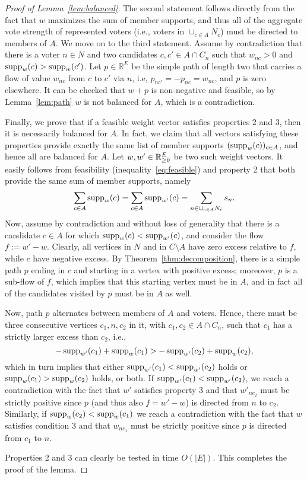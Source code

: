 \begin{proof}[Proof of Lemma~\ref{lem:balanced}]
The second statement follows directly from the fact that $w$ maximizes the sum of member supports, and thus all of the aggregate vote strength of represented voters (i.e., voters in $\cup_{c\in A} N_c$) must be directed to members of $A$. 
We move on to the third statement. 
Assume by contradiction that there is a voter $n\in N$ and two candidates $c, c'\in A\cap C_n$ such that $w_{nc}>0$ and $\operatorname{supp}_w(c)>\operatorname{supp}_w(c')$. 
Let $p\in\mathbb{R}^E$ be the simple path of length two that carries a flow of value $w_{nc}$ from $c$ to $c'$ via $n$, i.e, $p_{nc'}=-p_{nc}=w_{nc}$, and $p$ is zero elsewhere. 
It can be checked that $w+p$ is non-negative and feasible, so by Lemma~\ref{lem:path} $w$ is not balanced for $A$, which is a contradiction. 

Finally, we prove that if a feasible weight vector satisfies properties 2 and 3, then it is necessarily balanced for $A$. 
In fact, we claim that all vectors satisfying these properties provide exactly the same list of member supports $(\operatorname{supp}_w(c))_{c\in A}$, and hence all are balanced for $A$. 
Let $w, w'\in\mathbb{R}_{\geq 0}^E$ be two such weight vectors. It easily follows from feasibility (inequality~\ref{eq:feasible}) and property 2 that both provide the same sum of member supports, namely 
$$\sum_{c\in A} \operatorname{supp}_w(c) = \sum_{c\in A} \operatorname{supp}_{w'}(c) =\sum_{n\in \cup_{c\in A} N_c} s_n.$$
% 
Now, assume by contradiction and without loss of generality that there is a candidate $c\in A$ for which $\operatorname{supp}_{w}(c)<\operatorname{supp}_{w'}(c)$, and consider the flow $f:=w'-w$. 
Clearly, all vertices in $N$ and in $C\setminus A$ have zero excess relative to $f$, while $c$ have negative excess. 
By Theorem~\ref{thm:decomposition}, there is a simple path $p$ ending in $c$ and starting in a vertex with positive excess; 
moreover, $p$ is a sub-flow of $f$, which implies that this starting vertex must be in $A$, and in fact all of the candidates visited by $p$ must be in $A$ as well.  

Now, path $p$ alternates between members of $A$ and voters. Hence, there must be three consecutive vertices $c_1, n, c_2$ in it, with $c_1, c_2\in A\cap C_{n}$, such that $c_1$ has a strictly larger excess than $c_2$, i.e., 
$$- \operatorname{supp}_{w'}(c_1)+\operatorname{supp}_w(c_1) > - \operatorname{supp}_{w'}(c_2) + \operatorname{supp}_w(c_2),$$ 
which in turn implies that either $\operatorname{supp}_{w'}(c_1)<\operatorname{supp}_{w'}(c_2)$ holds or $\operatorname{supp}_{w}(c_1)>\operatorname{supp}_w(c_2)$ holds, or both. 
If $\operatorname{supp}_{w'}(c_1)<\operatorname{supp}_{w'}(c_2)$, we reach a contradiction with the fact that $w'$ satisfies property 3 and that $w'_{nc_2}$ must be strictly positive since $p$ (and thus also $f=w'-w$) is directed from $n$ to $c_2$. 
Similarly, if $\operatorname{supp}_w(c_2)<\operatorname{supp}_{w}(c_1)$ we reach a contradiction with the fact that $w$ satisfies condition 3 and that $w_{nc_1}$ must be strictly positive since $p$ is directed from $c_1$ to $n$. 

Properties 2 and 3 can clearly be tested in time $O(|E|)$. This completes the proof of the lemma.
\end{proof}


